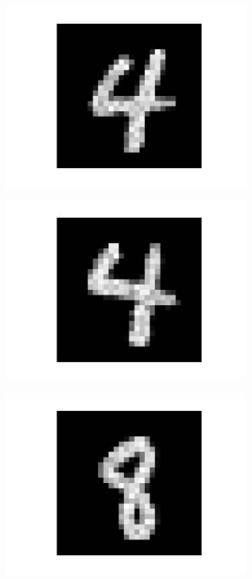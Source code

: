 \begin{figure}[h!]
	\centering
	\begin{subfigure}{.24\textwidth}
  		\centering
  		\includegraphics[width=0.6\linewidth]{imgs/convert/err/err1.png}
  		\label{fig:sub1}
	\end{subfigure}%
	\begin{subfigure}{.24\textwidth}
  		\centering
  		\includegraphics[width=0.6\linewidth]{imgs/convert/err/err2.png}
  		\label{fig:sub1}
	\end{subfigure}%
	\begin{subfigure}{.24\textwidth}
  		\centering
  		\includegraphics[width=0.6\linewidth]{imgs/convert/err/err4.png}
  		\label{fig:sub1}
	\end{subfigure}%
	\begin{subfigure}{.24\textwidth}

\end{subfigure}
\end{figure}
